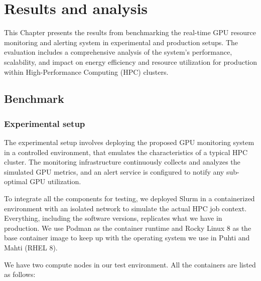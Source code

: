 \chapter{Results and analysis}
\label{chap:result}
This Chapter presents the results from benchmarking the real-time GPU resource monitoring and alerting system in experimental and production setups. The evaluation includes a comprehensive analysis of the system's performance, scalability, and impact on energy efficiency and resource utilization for production within High-Performance Computing (HPC) clusters.

\section{Benchmark}
\subsection{Experimental setup}
\label{subsection:experiment}
The experimental setup involves deploying the proposed GPU monitoring system in a controlled environment, that emulates the characteristics of a typical HPC cluster. The monitoring infrastructure continuously collects and analyzes the simulated GPU metrics, and an alert service is configured to notify any sub-optimal GPU utilization.

To integrate all the components for testing, we deployed Slurm in a containerized environment with an isolated network to simulate the actual HPC job context. Everything, including the software versions, replicates what we have in production. We use Podman as the container runtime and Rocky Linux 8 as the base container image to keep up with the operating system we use in Puhti and Mahti (RHEL 8).

We have two compute nodes in our test environment. All the containers are listed as follows:
 
